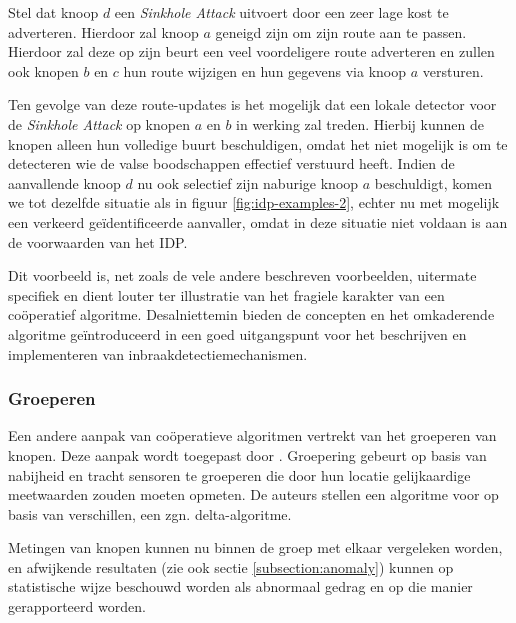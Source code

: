 Stel dat knoop $d$ een \emph{Sinkhole Attack} uitvoert door een zeer lage kost
te adverteren. Hierdoor zal knoop $a$ geneigd zijn om zijn route aan te passen.
Hierdoor zal deze op zijn beurt een veel voordeligere route adverteren en
zullen ook knopen $b$ en $c$ hun route wijzigen en hun gegevens via knoop $a$
versturen.

Ten gevolge van deze route-updates is het mogelijk dat een lokale detector voor
de \emph{Sinkhole Attack} op knopen $a$ en $b$ in werking zal treden. Hierbij
kunnen de knopen alleen hun volledige buurt beschuldigen, omdat het niet
mogelijk is om te detecteren wie de valse boodschappen effectief verstuurd
heeft. Indien de aanvallende knoop $d$ nu ook selectief zijn naburige knoop $a$
beschuldigt, komen we tot dezelfde situatie als in figuur
\ref{fig:idp-examples-2}, echter nu met mogelijk een verkeerd
ge\"identificeerde aanvaller, omdat in deze situatie niet voldaan is aan de
voorwaarden van het IDP.

Dit voorbeeld is, net zoals de vele andere beschreven voorbeelden, uitermate
specifiek en dient louter ter illustratie van het fragiele karakter van een
co\"operatief algoritme. Desalniettemin bieden de concepten en het omkaderende
algoritme ge\"introduceerd in \citep{krontiris2009cooperative} een goed
uitgangspunt voor het beschrijven en implementeren van
inbraakdetectiemechanismen.

\subsubsection*{Groeperen}
\label{subsubsection:grouping}

Een andere aanpak van co\"operatieve algoritmen vertrekt van het groeperen van
knopen. Deze aanpak wordt toegepast door \citep{li2008group}. Groepering
gebeurt op basis van nabijheid en tracht sensoren te groeperen die door hun
locatie gelijkaardige meetwaarden zouden moeten opmeten. De auteurs stellen een
algoritme voor op basis van verschillen, een zgn. delta-algoritme.

Metingen van knopen kunnen nu binnen de groep met elkaar vergeleken worden, en
afwijkende resultaten (zie ook sectie \ref{subsection:anomaly}) kunnen op
statistische wijze beschouwd worden als abnormaal gedrag en op die manier
gerapporteerd worden.
